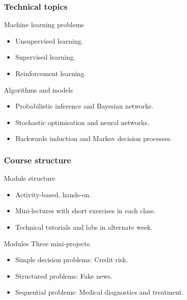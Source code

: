   \begin{frame}
    \frametitle{Technical topics}
    
    \begin{block}{Machine learning problems}
      \begin{itemize}
      \item Unsupervised learning.
      \item Supervised learning.
      \item Reinforcement learning.
      \end{itemize}
    \end{block}

    \begin{block}{Algorithms and models}
      \begin{itemize}
      \item Probabilistic inference and Bayesian networks.
      \item Stochastic optimisation and neural networks.
      \item Backwards induction and Markov decision processes.
      \end{itemize}
    \end{block}
  \end{frame}

  \begin{frame}
    \frametitle{Course structure}
    \begin{block}{Module structure}
      \begin{itemize}
      \item \alert{Activity}-based, hands-on.
      \item Mini-lectures with short exercises in each class.
      \item Technical tutorials and labs in alternate week.
      \end{itemize}
    \end{block}

    \begin{block}{Modules}
      Three mini-projects.
      \begin{itemize}
      \item Simple decision problems: Credit risk.
      \item Structured problems: Fake news.
      \item Sequential problems: Medical diagnostics and treatment.
      \end{itemize}
    \end{block}
  \end{frame}






